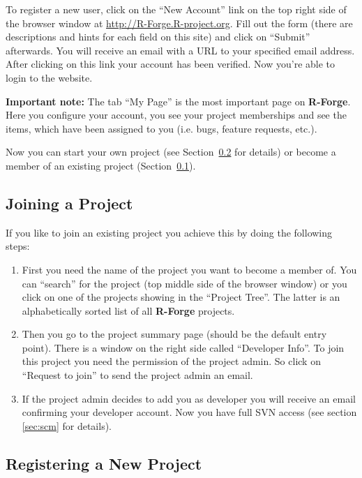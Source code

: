 \documentclass[a4paper]{article}
\begin{document}
To register a new user, click on the ``New Account'' link on the top
right side of the browser window at \url{http://R-Forge.R-project.org}.
Fill out the form (there are descriptions and hints for each field on
this site) and click on ``Submit'' afterwards. You will receive an
email with
a URL to your specified email address. After clicking on this link
your account has been verified. Now you're able to login to the
website.
\newline

\textbf{Important note:} The tab ``My Page'' is the most important
page on \textbf{R-Forge}. Here you configure your account, you see your
project memberships and see the items, which have been assigned to you
(i.e. bugs, feature requests, etc.).
\newline

Now you can start your own project (see Section~\ref{sec:newproject}
for details) or become a member of an existing project
(Section~\ref{sec:joinproject}). 

\subsection{Joining a Project}
\label{sec:joinproject}
If you like to join an existing project you achieve this by doing the
following steps:
\begin{enumerate}
\item First you need the name of the project you want to become a
  member of. You can ``search'' for the project (top middle side of the
  browser window) or you click on one of the projects showing in the
  ``Project Tree''. The latter is an alphabetically sorted list of all
  \textbf{R-Forge} projects.
\item Then you go to the project summary page (should be the default
  entry point). There is a window on the right side called
  ``Developer Info''. To join this project you need the permission of
  the project admin. So click on ``Request to join'' to send the
  project admin an email.
\item If the project admin decides to add you as developer you will
  receive an email confirming your developer account. Now you have
  full SVN access (see section \ref{sec:scm} for details).
\end{enumerate}

\subsection{Registering a New Project}
\label{sec:newproject}
\end{document}
